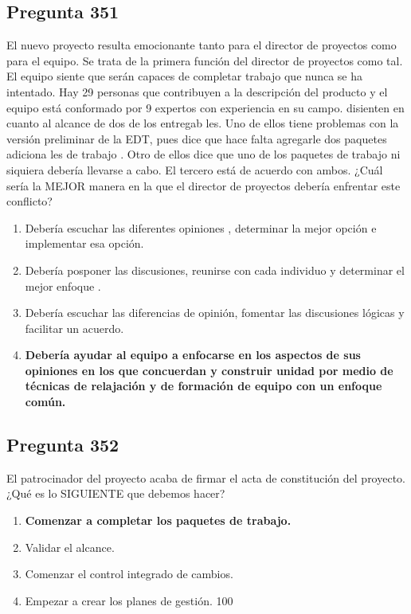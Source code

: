 \documentclass[11pt,a4paper]{article}
\begin{document}
\subsection*{Pregunta 351}
El nuevo proyecto resulta emocionante tanto para el director de proyectos como para el equipo. Se trata de la primera función del director de proyectos como tal. El equipo siente que serán capaces de completar trabajo que nunca se ha intentado. Hay 29 personas que contribuyen a la descripción del producto y el equipo está conformado por 9 expertos con experiencia en su campo. disienten en cuanto al alcance de dos de los entregab les. Uno de ellos tiene problemas con la versión preliminar de la EDT, pues dice que hace falta agregarle dos paquetes adiciona les de trabajo . Otro de ellos dice que uno de los paquetes de trabajo ni siquiera debería llevarse a cabo. El tercero está de acuerdo con ambos. ¿Cuál sería la MEJOR manera en la que el director de proyectos debería enfrentar este conflicto?

\begin{enumerate}[label=\alph*)]
  \item Debería escuchar las diferentes opiniones , determinar la mejor opción e implementar esa opción.
  \item Debería posponer las discusiones, reunirse con cada individuo y determinar el mejor enfoque .
  \item Debería escuchar las diferencias de opinión, fomentar las discusiones lógicas y facilitar un acuerdo.
  \item \textbf{Debería ayudar al equipo a enfocarse en los aspectos de sus opiniones en los que concuerdan y construir unidad por medio de técnicas de relajación y de formación de equipo con un enfoque común.}
\end{enumerate}

\subsection*{Pregunta 352}
El patrocinador del proyecto acaba de firmar el acta de constitución del proyecto. ¿Qué es lo SIGUIENTE que debemos hacer?

\begin{enumerate}[label=\alph*)]
  \item \textbf{Comenzar a completar los paquetes de trabajo.}
  \item Validar el alcance.
  \item Comenzar el control integrado de cambios.
  \item Empezar a crear los planes de gestión. 100
\end{enumerate}
\end{document}
